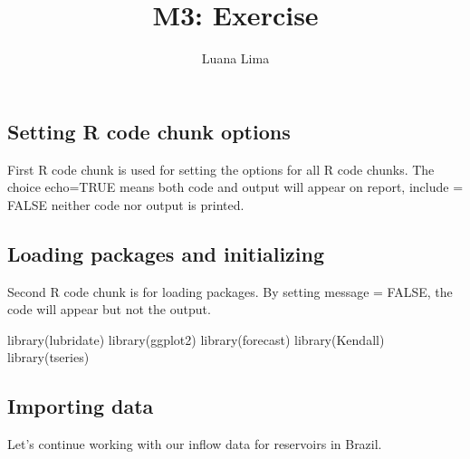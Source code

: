 \documentclass[
]{article}
\title{M3: Exercise}
\author{Luana Lima}
\date{}
\newenvironment{Shaded}{\begin{snugshade}}{\end{snugshade}}
\newcommand{\FunctionTok}[1]{\textcolor[rgb]{0.00,0.00,0.00}{#1}}
\newcommand{\NormalTok}[1]{#1}
\begin{document}
\maketitle

\hypertarget{setting-r-code-chunk-options}{%
\subsection{Setting R code chunk
options}\label{setting-r-code-chunk-options}}

First R code chunk is used for setting the options for all R code
chunks. The choice echo=TRUE means both code and output will appear on
report, include = FALSE neither code nor output is printed.

\hypertarget{loading-packages-and-initializing}{%
\subsection{Loading packages and
initializing}\label{loading-packages-and-initializing}}

Second R code chunk is for loading packages. By setting message = FALSE,
the code will appear but not the output.

\begin{Shaded}
\begin{Highlighting}[]
\FunctionTok{library}\NormalTok{(lubridate)}
\FunctionTok{library}\NormalTok{(ggplot2)}
\FunctionTok{library}\NormalTok{(forecast)}
\FunctionTok{library}\NormalTok{(Kendall)}
\FunctionTok{library}\NormalTok{(tseries)}
\end{Highlighting}
\end{Shaded}

\hypertarget{importing-data}{%
\subsection{Importing data}\label{importing-data}}

Let's continue working with our inflow data for reservoirs in Brazil.
\end{document}
